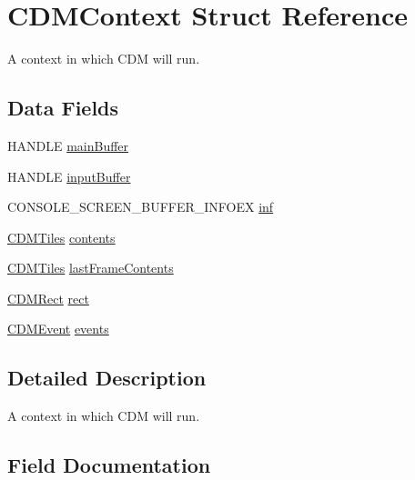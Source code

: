 \hypertarget{struct_c_d_m_context}{}\section{C\+D\+M\+Context Struct Reference}
\label{struct_c_d_m_context}


A context in which C\+DM will run.  


\subsection*{Data Fields}
\begin{DoxyCompactItemize}
\item 
H\+A\+N\+D\+LE \mbox{\hyperlink{struct_c_d_m_context_ad227f466f24fdd059e08e196f7fbab7f}{main\+Buffer}}
\item 
H\+A\+N\+D\+LE \mbox{\hyperlink{struct_c_d_m_context_adfe043e2777ad6c1ef5fc7a83b928d25}{input\+Buffer}}
\item 
C\+O\+N\+S\+O\+L\+E\+\_\+\+S\+C\+R\+E\+E\+N\+\_\+\+B\+U\+F\+F\+E\+R\+\_\+\+I\+N\+F\+O\+EX \mbox{\hyperlink{struct_c_d_m_context_a8476715d51a87d0e92e46b9be0ecd138}{inf}}
\item 
\mbox{\hyperlink{struct_c_d_m_tiles}{C\+D\+M\+Tiles}} \mbox{\hyperlink{struct_c_d_m_context_ac8c52228a53211702c5785f9c82e2f83}{contents}}
\item 
\mbox{\hyperlink{struct_c_d_m_tiles}{C\+D\+M\+Tiles}} \mbox{\hyperlink{struct_c_d_m_context_a489dca0960ee59a8f22f85c5b5fc6aed}{last\+Frame\+Contents}}
\item 
\mbox{\hyperlink{_c_d_m_8h_a23402dc2128c3c7f1e88e505a5631b9c}{C\+D\+M\+Rect}} \mbox{\hyperlink{struct_c_d_m_context_aa61e26c3b59930152cdaa0ce2dac8b14}{rect}}
\item 
\mbox{\hyperlink{struct_c_d_m_event}{C\+D\+M\+Event}} \mbox{\hyperlink{struct_c_d_m_context_ab97a0f3b9d5615487c4e542601499e94}{events}}
\end{DoxyCompactItemize}


\subsection{Detailed Description}
A context in which C\+DM will run. 

\subsection{Field Documentation}
\mbox{\label{struct_c_d_m_context_ac8c52228a53211702c5785f9c82e2f83}} 
